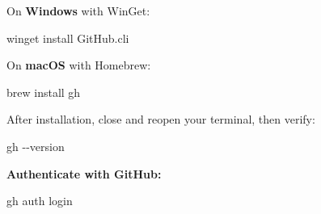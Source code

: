 \documentclass[
  letterpaper,
  DIV=11,
  numbers=noendperiod]{scrreprt}
\newenvironment{Shaded}{\begin{snugshade}}{\end{snugshade}}
\newcommand{\AttributeTok}[1]{\textcolor[rgb]{0.40,0.45,0.13}{#1}}
\newcommand{\ExtensionTok}[1]{\textcolor[rgb]{0.00,0.23,0.31}{#1}}
\newcommand{\FunctionTok}[1]{\textcolor[rgb]{0.28,0.35,0.67}{#1}}
\newcommand{\NormalTok}[1]{\textcolor[rgb]{0.00,0.23,0.31}{#1}}
\newcommand{\OperatorTok}[1]{\textcolor[rgb]{0.37,0.37,0.37}{#1}}
\begin{document}
On \textbf{Windows} with WinGet:

\begin{codelisting}

\caption{\texttt{terminal}}

\begin{Shaded}
\begin{Highlighting}[]
\NormalTok{winget install GitHub}\OperatorTok{.}\FunctionTok{cli}
\end{Highlighting}
\end{Shaded}

\end{codelisting}

On \textbf{macOS} with Homebrew:

\begin{codelisting}

\caption{\texttt{terminal}}

\begin{Shaded}
\begin{Highlighting}[]
\ExtensionTok{brew}\NormalTok{ install gh}
\end{Highlighting}
\end{Shaded}

\end{codelisting}

After installation, close and reopen your terminal, then verify:

\begin{codelisting}

\caption{\texttt{terminal}}

\begin{Shaded}
\begin{Highlighting}[]
\ExtensionTok{gh} \AttributeTok{{-}{-}version}
\end{Highlighting}
\end{Shaded}

\end{codelisting}

\textbf{Authenticate with GitHub:}

\begin{codelisting}

\caption{\texttt{terminal}}

\begin{Shaded}
\begin{Highlighting}[]
\ExtensionTok{gh}\NormalTok{ auth login}
\end{Highlighting}
\end{Shaded}

\end{codelisting}
\end{document}

